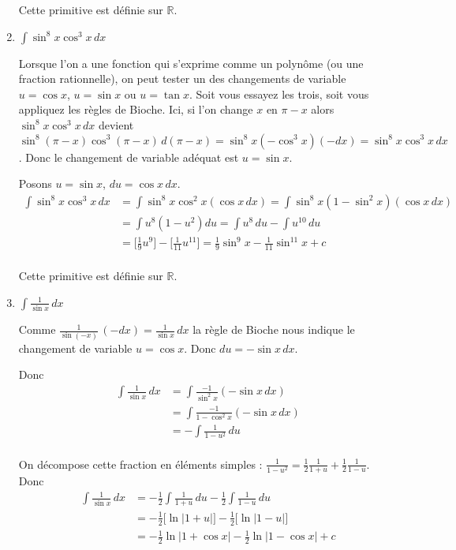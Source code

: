 \documentclass[11pt,a4paper]{article}
\newcommand{\Rr}{\mathbb{R}} \newcommand{\R}{\mathbb{R}}
\begin{document}
\begin{enumerate}
Cette primitive est définie sur $\Rr$.


  \item $\int \sin ^8x\cos ^3x \, dx$

Lorsque l'on a une fonction qui s'exprime comme un polynôme (ou une fraction rationnelle),
on peut tester un des changements de variable $u=\cos x$, $u= \sin x$ ou $u= \tan x$.
Soit vous essayez les trois, soit vous appliquez les règles de Bioche. Ici,
si l'on change $x$ en $\pi-x$ alors $\sin ^8x\cos ^3x \, dx$
devient $\sin ^8(\pi-x)\cos ^3 (\pi-x) \, d(\pi -x)= \sin^8 x (-\cos^3 x) (-dx) = \sin ^8x\cos ^3x \, dx$.
Donc le changement de variable adéquat est $u=\sin x$.


Posons $u=\sin x$, $du = \cos x \, dx$.
\begin{align*}
\int \sin ^8x\cos ^3 x \, dx  
  &= \int \sin^8 x \cos^2 x (\cos x \, dx) = \int \sin^8 x (1-\sin^2 x) (\cos x \, dx) \\ 
  &= \int u^8 (1-u^2) du  = \int u^8 \, du - \int u^{10} \, du \\
  &= \big[\frac19 u^9 \big] - \big[ \frac1{11} u^{11}\big] = \frac19\sin^9 x-\frac1{11}\sin^{11} x + c \\
\end{align*}


Cette primitive est définie sur $\Rr$.


  \item $\int \frac 1{\sin x} \, dx$

Comme $\frac 1{\sin (-x)} \, (-dx) = \frac 1{\sin x} \, dx$ la règle de Bioche nous indique le changement de variable 
$u=\cos x$. Donc $du = -\sin x \, dx$.

Donc
\begin{align*}
\int \frac 1{\sin x} \, dx 
  &= \int \frac{-1}{\sin^2 x} (  -\sin x \, dx) \\
  &= \int \frac{-1}{1-\cos^2 x} (  -\sin x \, dx) \\
  &= -\int \frac{1}{1-u^2} \, du \\
\end{align*}

On décompose cette fraction en éléments simples : $\frac{1}{1-u^2}= \frac 12 \frac{1}{1+u} + \frac 12 \frac{1}{1-u}$.
Donc
\begin{align*}
\int \frac 1{\sin x} \, dx 
  &= - \frac 12 \int \frac{1}{1+u}\, du - \frac 12 \int \frac{1}{1-u}\, du \\
  &= - \frac 12 \big[ \ln |1+u| \big]- \frac 12 \big[ \ln |1-u| \big] \\
  &= - \frac 12 \ln |1+\cos x| - \frac 12 \ln |1-\cos x| + c  \\
\end{align*}


\end{enumerate}
\end{document}

